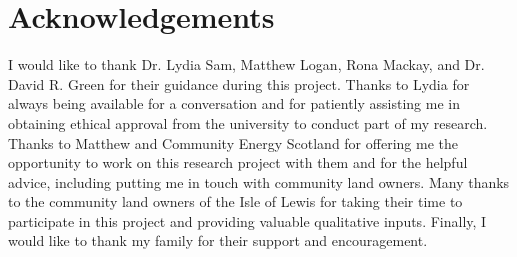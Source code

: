 \chapter{Acknowledgements}

I would like to thank Dr. Lydia Sam, Matthew Logan, Rona Mackay, and Dr. David R. Green for their guidance during this project. Thanks to Lydia for always being available for a conversation and for patiently assisting me in obtaining ethical approval from the university to conduct part of my research. Thanks to Matthew and Community Energy Scotland for offering me the opportunity to work on this research project with them and for the helpful advice, including putting me in touch with community land owners. Many thanks to the community land owners of the Isle of Lewis for taking their time to participate in this project and providing valuable qualitative inputs. Finally, I would like to thank my family for their support and encouragement.
